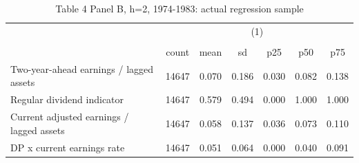\begin{table}[htbp]\centering
\def\sym#1{\ifmmode^{#1}\else\(^{#1}\)\fi}
\caption{Table 4 Panel B, h=2, 1974-1983: actual regression sample}
\begin{tabular}{l*{1}{cccccc}}
\hline\hline
                    &\multicolumn{6}{c}{(1)}                                                      \\
                    &\multicolumn{6}{c}{}                                                         \\
                    &       count&        mean&          sd&         p25&         p50&         p75\\
\hline
Two-year-ahead earnings / lagged assets&       14647&       0.070&       0.186&       0.030&       0.082&       0.138\\
Regular dividend indicator&       14647&       0.579&       0.494&       0.000&       1.000&       1.000\\
Current adjusted earnings / lagged assets&       14647&       0.058&       0.137&       0.036&       0.073&       0.110\\
DP x current earnings rate&       14647&       0.051&       0.064&       0.000&       0.040&       0.091\\
\hline\hline
\end{tabular}
\end{table}
